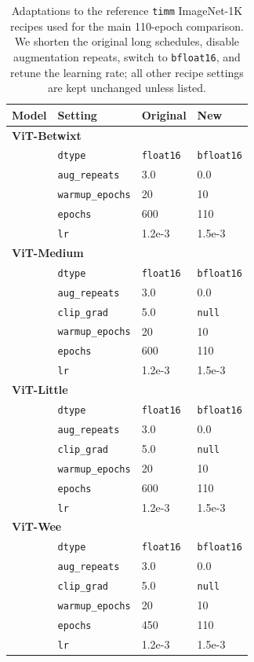 \begin{table}[!htbp]
  \centering
  \setlength{\tabcolsep}{5pt}
  \caption{Adaptations to the reference \texttt{timm} ImageNet-1K recipes used
for the main 110-epoch comparison. We shorten the original long schedules,
disable augmentation repeats, switch to \texttt{bfloat16}, and retune the
learning rate; all other recipe settings are kept unchanged unless listed.}
  \label{tab:timm-adaptations}
  \begin{tabular}{llll}
    \toprule
    Model & Setting & Original & New \\
    \midrule
    \multicolumn{4}{l}{\textbf{ViT-Betwixt}} \\
    & \texttt{dtype} & \texttt{float16} & \texttt{bfloat16} \\
    & \texttt{aug\_repeats} & 3.0 & 0.0 \\
    & \texttt{warmup\_epochs} & 20 & 10 \\
    & \texttt{epochs} & 600 & 110 \\
    & \texttt{lr} & 1.2e-3 & 1.5e-3 \\
    \midrule
    \multicolumn{4}{l}{\textbf{ViT-Medium}} \\
    & \texttt{dtype} & \texttt{float16} & \texttt{bfloat16} \\
    & \texttt{aug\_repeats} & 3.0 & 0.0 \\
    & \texttt{clip\_grad} & 5.0 & \texttt{null} \\
    & \texttt{warmup\_epochs} & 20 & 10 \\
    & \texttt{epochs} & 600 & 110 \\
    & \texttt{lr} & 1.2e-3 & 1.5e-3 \\
    \midrule
    \multicolumn{4}{l}{\textbf{ViT-Little}} \\
    & \texttt{dtype} & \texttt{float16} & \texttt{bfloat16} \\
    & \texttt{aug\_repeats} & 3.0 & 0.0 \\
    & \texttt{clip\_grad} & 5.0 & \texttt{null} \\
    & \texttt{warmup\_epochs} & 20 & 10 \\
    & \texttt{epochs} & 600 & 110 \\
    & \texttt{lr} & 1.2e-3 & 1.5e-3 \\
    \midrule
    \multicolumn{4}{l}{\textbf{ViT-Wee}} \\
    & \texttt{dtype} & \texttt{float16} & \texttt{bfloat16} \\
    & \texttt{aug\_repeats} & 3.0 & 0.0 \\
    & \texttt{clip\_grad} & 5.0 & \texttt{null} \\
    & \texttt{warmup\_epochs} & 20 & 10 \\
    & \texttt{epochs} & 450 & 110 \\
    & \texttt{lr} & 1.2e-3 & 1.5e-3 \\
    \bottomrule
  \end{tabular}
\end{table}